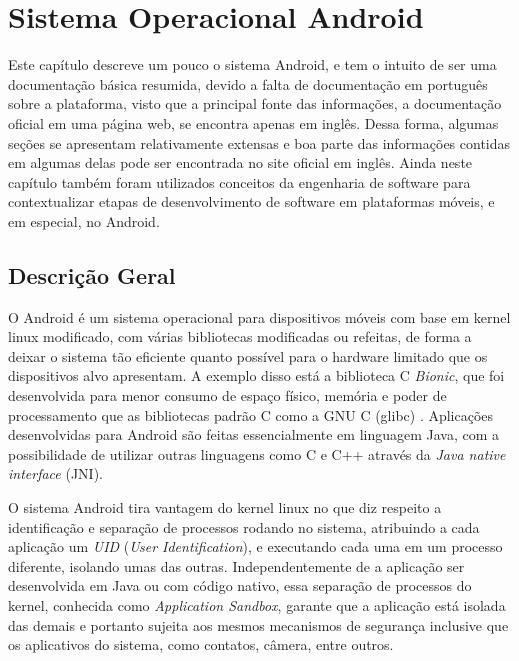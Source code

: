 \chapter[Sistema Operacional Android]{Sistema Operacional Android\footnotemark}
\label{cap:android-os}

Este capítulo descreve um pouco o sistema Android, e tem o intuito de ser uma documentação básica resumida, devido a falta de documentação em português sobre a plataforma, visto que a principal fonte das informações, a documentação oficial em uma página web, se encontra apenas em inglês. Dessa forma, algumas seções se apresentam relativamente extensas e boa parte das informações contidas em algumas delas pode ser encontrada no site oficial em inglês. 
Ainda neste capítulo também foram utilizados conceitos da engenharia de software para contextualizar etapas de desenvolvimento de software em plataformas móveis, e em especial, no Android.

\section{Descrição Geral}

O Android é um sistema operacional para dispositivos móveis com base em kernel linux modificado, com várias bibliotecas modificadas ou refeitas, de forma a deixar o sistema tão eficiente quanto possível para o hardware limitado que os dispositivos alvo apresentam. A exemplo disso está a biblioteca C \textit{Bionic}, que foi desenvolvida para menor consumo de espaço físico, memória e poder de processamento que as bibliotecas padrão C como a GNU C (glibc) \cite{devos2014}. Aplicações desenvolvidas para Android são feitas essencialmente em linguagem Java, com a possibilidade de utilizar outras linguagens como C e C++ através da \textit{Java native interface} (JNI). 

O sistema Android tira vantagem do kernel linux no que diz respeito a identificação e separação de processos rodando no sistema, atribuindo a cada aplicação um \textit{UID} (\textit{User Identification}), e executando cada uma em um processo diferente, isolando umas das outras.  Independentemente de a aplicação ser desenvolvida em Java ou com código nativo, essa separação de processos do kernel, conhecida como \textit{Application Sandbox}, garante que a aplicação está isolada das demais e portanto sujeita aos mesmos mecanismos de segurança inclusive que os aplicativos do sistema, como contatos, câmera, entre outros. 

